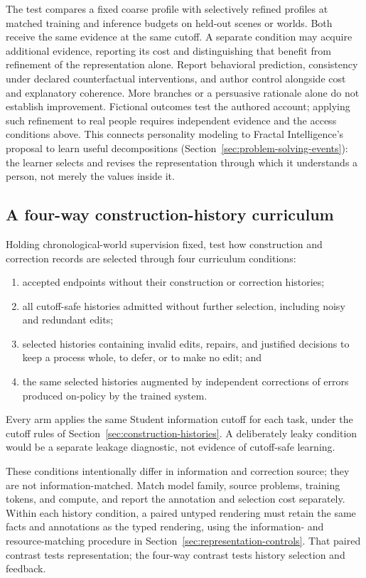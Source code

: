 \documentclass[10pt]{article}
\begin{document}
The test compares a fixed coarse profile with selectively refined profiles at
matched training and inference budgets on held-out scenes or worlds. Both
receive the same evidence at the same cutoff. A separate condition may acquire
additional evidence, reporting its cost and distinguishing that benefit from
refinement of the representation alone. Report
behavioral prediction, consistency under declared counterfactual interventions,
and author control alongside cost and explanatory coherence. More branches or
a persuasive rationale alone do not establish improvement. Fictional outcomes
test the authored account; applying such refinement to real people requires
independent evidence and the access conditions above. This connects personality
modeling to Fractal Intelligence's proposal to learn useful decompositions
(Section~\ref{sec:problem-solving-events}): the learner selects and revises the
representation through which it understands a person, not merely the values
inside it.

\subsection{A four-way construction-history curriculum}
\label{sec:history-curriculum}

Holding chronological-world supervision fixed, test how construction and
correction records are selected through four curriculum conditions:

\begin{enumerate}
  \item accepted endpoints without their construction or correction histories;
  \item all cutoff-safe histories admitted without further selection, including noisy and
    redundant edits;
  \item selected histories containing invalid edits, repairs, and
    justified decisions to keep a process whole, to defer, or to make no edit;
    and
  \item the same selected histories augmented by independent corrections of
    errors produced on-policy by the trained system.
\end{enumerate}

Every arm applies the same Student information cutoff for each task, under the
cutoff rules of Section~\ref{sec:construction-histories}.
A deliberately leaky condition would be a separate leakage diagnostic,
not evidence of cutoff-safe learning.

These conditions intentionally differ in information and correction source;
they are not information-matched. Match model family, source problems, training
tokens, and compute, and report the annotation and selection cost separately.
Within each history condition, a paired untyped rendering must retain the
same facts and annotations as the typed rendering, using the information-
and resource-matching procedure in Section~\ref{sec:representation-controls}.
That paired contrast tests representation; the four-way contrast tests
history selection and feedback.
\end{document}
